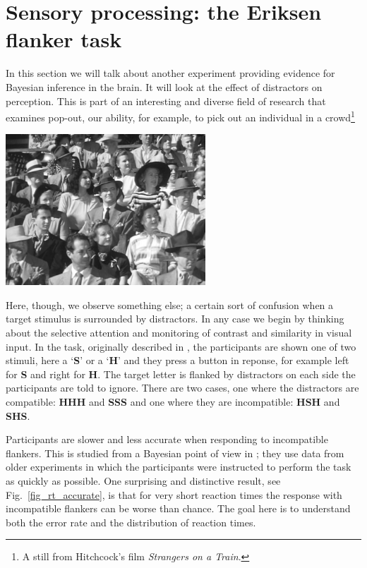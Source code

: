 \documentclass[12pt]{article}
\begin{document}
\section*{Sensory processing: the Eriksen flanker task}

In this section we will talk about another experiment providing
evidence for Bayesian inference in the brain. It will look at the
effect of distractors on perception. This is part of an interesting
and diverse field of research that examines pop-out, our ability, for
example, to pick out an individual in a crowd\footnote{A still from
  Hitchcock's film \textsl{Strangers on a Train}.}
\begin{center}
\includegraphics[width=7.5cm]{Strangers_on_a_Train.png}
\end{center}
Here, though, we observe something else; a certain sort of confusion
when a target stimulus is surrounded by distractors. In any case we
begin by thinking about the selective attention and monitoring of
contrast and similarity in visual input. In the task, originally
described in \citet{EriksenEriksen1974}, the participants are shown
one of two stimuli, here a \lq{}\textbf{S}\rq{} or a
\lq{}\textbf{H}\rq{} and they press a button in reponse, for example
left for \textbf{S} and right for \textbf{H}. The target letter is
flanked by distractors on each side the participants are told to
ignore. There are two cases, one where the distractors are compatible:
\textbf{HHH} and \textbf{SSS} and one where they are incompatible:
\textbf{HSH} and \textbf{SHS}.

Participants are slower and less accurate when responding to
incompatible flankers. This is studied from a Bayesian point of view
in \cite{YuDayanCohen2009}; they use data from older experiments in
which the participants were instructed to perform the task as quickly
as possible. One surprising and distinctive result, see
Fig.~\ref{fig_rt_accurate}, is that for very short reaction times the
response with incompatible flankers can be worse than chance. The goal
here is to understand both the error rate and the distribution of
reaction times.
\end{document}
